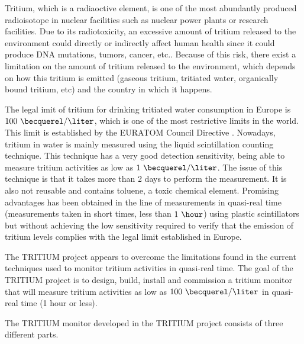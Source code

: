 Tritium, which is a radiaoctive element, is one of the most abundantly produced radioisotope in nuclear facilities such as nuclear power plants or research facilities. Due to its radiotoxicity, an excessive amount of tritium released to the environment could directly or indirectly affect human health since it could produce DNA mutations, tumors, cancer, etc.. Because of this risk, there exist a limitation on the amount of tritium released to the environment, which depends on how this tritium is emitted (gaseous tritium, tritiated water, organically bound tritium, etc) and the country in which it happens.

The legal imit of tritium for drinking tritiated water consumption in Europe is $100~\becquerel/\liter$, which is one of the most restrictive limits in the world. This limit is established by the EURATOM Council Directive \cite{EURATOM_GL}. Nowadays, tritium in water is mainly measured using the liquid scintillation counting technique. This technique has a very good detection sensitivity, being able to measure tritium activities as low as $1~\becquerel/\liter$. The issue of this technique is that it takes more than 2 days to perform the measurement. It is also not reusable and contains toluene, a toxic chemical element. Promising advantages has been obtained in the line of measurements in quasi-real time (measurements taken in short times, less than $1~\hour$) using plastic scintillators but without achieving the low sensitivity required to verify that the emission of tritium levels complies with the legal limit established in Europe.

The TRITIUM project appears to overcome the limitations found in the current techniques used to monitor tritium activities in quasi-real time. The goal of the TRITIUM project is to design, build, install and commission a tritium monitor that will measure tritium activities as low as $100~\becquerel/\liter$  in quasi-real time (1 hour or less).

The TRITIUM monitor developed in the TRITIUM project consists of three different parts.

